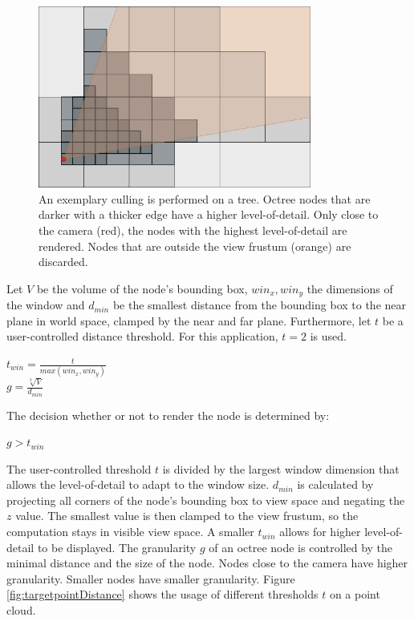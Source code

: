 \begin{figure}
   	\centering
    \includegraphics[width=0.8\textwidth]{Implementation/octreeCulling.png}
    \caption[Exemplary octree culling]
		{An exemplary culling is performed on a tree. Octree nodes that are darker with a thicker edge have a higher level-of-detail. Only close to the camera (red), the nodes with the highest level-of-detail are rendered. Nodes that are outside the view frustum (orange) are discarded. }
    \label{fig:octreeCulling}
\end{figure}


Let $V$ be the volume of the node's bounding box, $win_x, win_y$ the dimensions of the window and $d_{min}$ be the smallest distance from the bounding box to the near plane in world space, clamped by the near and far plane. Furthermore, let $t$ be a user-controlled distance threshold. For this application, $t = 2$ is used. 

\begin{center}
$t_{win} = \frac{t}{max (win_x, win_y)}$ \\
$g = \frac{\sqrt[3]{V}}{d_{min}}$ \\
\end{center}
The decision whether or not to render the node is determined by:
\begin{center}
$g > t_{win}$
\end{center}

The user-controlled threshold $t$ is divided by the largest window dimension that allows the level-of-detail to adapt to the window size. $d_{min}$ is calculated by projecting all corners of the node's bounding box to view space and negating the $z$ value. The smallest value is then clamped to the view frustum, so the computation stays in visible view space. A smaller $t_{win}$ allows for higher level-of-detail to be displayed. The granularity $g$ of an octree node is controlled by the minimal distance and the size of the node. Nodes close to the camera have higher granularity. Smaller nodes have smaller granularity. Figure \ref{fig:targetpointDistance} shows the usage of different thresholds $t$ on a point cloud. 

